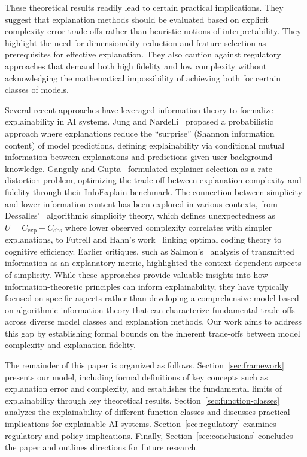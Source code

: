 \documentclass[11pt,letter,leqno]{article}
\begin{document}
These theoretical results readily lead to certain practical implications.  They suggest that explanation methods should be evaluated based on explicit complexity-error trade-offs rather than heuristic notions of interpretability.  They highlight the need for dimensionality reduction and feature selection as prerequisites for effective explanation.  They also caution against regulatory approaches that demand both high fidelity and low complexity without acknowledging the mathematical impossibility of achieving both for certain classes of models.

Several recent approaches have leveraged information theory to formalize explainability in AI systems.  Jung and Nardelli~\cite{jung2020information} proposed a probabilistic approach where explanations reduce the ``surprise'' (Shannon information content) of model predictions, defining explainability via conditional mutual information between explanations and predictions given user background knowledge.  Ganguly and Gupta~\cite{ganguly2022machine} formulated explainer selection as a rate-distortion problem, optimizing the trade-off between explanation complexity and fidelity through their InfoExplain benchmark.  The connection between simplicity and lower information content has been explored in various contexts, from Dessalles'~\cite{dessalles2013simplicity} algorithmic simplicity theory, which defines unexpectedness as $U = C_{\text{exp}} - C_{\text{obs}}$ where lower observed complexity correlates with simpler explanations, to Futrell and Hahn's work~\cite{futrell2022information} linking optimal coding theory to cognitive efficiency.  Earlier critiques, such as Salmon's~\cite{philosci1978transmitted} analysis of transmitted information as an explanatory metric, highlighted the context-dependent aspects of simplicity.  While these approaches provide valuable insights into how information-theoretic principles can inform explainability, they have typically focused on specific aspects rather than developing a comprehensive model based on algorithmic information theory that can characterize fundamental trade-offs across diverse model classes and explanation methods.  Our work aims to address this gap by establishing formal bounds on the inherent trade-offs between model complexity and explanation fidelity.

The remainder of this paper is organized as follows.  Section~\ref{sec:framework} presents our model, including formal definitions of key concepts such as explanation error and complexity, and establishes the fundamental limits of explainability through key theoretical results.  Section~\ref{sec:function-classes} analyzes the explainability of different function classes and discusses practical implications for explainable AI systems.  Section~\ref{sec:regulatory} examines regulatory and policy implications.  Finally, Section~\ref{sec:conclusions} concludes the paper and outlines directions for future research.
\end{document}
